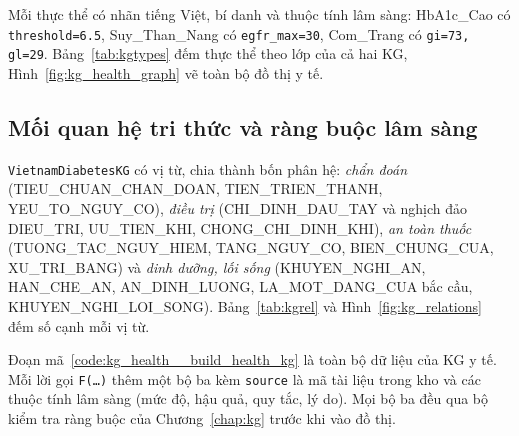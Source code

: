 

Mỗi thực thể có nhãn tiếng Việt, bí danh và thuộc tính lâm sàng: \textsf{HbA1c\_Cao} có \texttt{threshold=6.5},
\textsf{Suy\_Than\_Nang} có \texttt{egfr\_max=30}, \textsf{Com\_Trang} có \texttt{gi=73, gl=29}. Bảng~\ref{tab:kgtypes}
đếm thực thể theo lớp của cả hai KG, Hình~\ref{fig:kg_health_graph} vẽ toàn bộ đồ thị y tế.



\subsection{Mối quan hệ tri thức và ràng buộc lâm sàng}
\texttt{VietnamDiabetesKG} có  vị từ, chia thành bốn phân hệ: \emph{chẩn đoán}
(\textsf{TIEU\_CHUAN\_CHAN\_DOAN}, \textsf{TIEN\_TRIEN\_THANH}, \textsf{YEU\_TO\_NGUY\_CO}), \emph{điều trị}
(\textsf{CHI\_DINH\_DAU\_TAY} và nghịch đảo \textsf{DIEU\_TRI}, \textsf{UU\_TIEN\_KHI},
\textsf{CHONG\_CHI\_DINH\_KHI}), \emph{an toàn thuốc} (\textsf{TUONG\_TAC\_NGUY\_HIEM}, \textsf{TANG\_NGUY\_CO},
\textsf{BIEN\_CHUNG\_CUA}, \textsf{XU\_TRI\_BANG}) và \emph{dinh dưỡng, lối sống} (\textsf{KHUYEN\_NGHI\_AN},
\textsf{HAN\_CHE\_AN}, \textsf{AN\_DINH\_LUONG}, \textsf{LA\_MOT\_DANG\_CUA} bắc cầu, \textsf{KHUYEN\_NGHI\_LOI\_SONG}).
Bảng~\ref{tab:kgrel} và Hình~\ref{fig:kg_relations} đếm số cạnh mỗi vị từ.


Đoạn mã~\ref{code:kg_health__build_health_kg} là toàn bộ dữ liệu của KG y tế. Mỗi lời gọi \texttt{F(\dots)} thêm
một bộ ba kèm \texttt{source} là mã tài liệu trong kho và các thuộc tính lâm sàng (mức độ, hậu quả, quy tắc, lý
do). Mọi bộ ba đều qua bộ kiểm tra ràng buộc của Chương~\ref{chap:kg} trước khi vào đồ thị.

